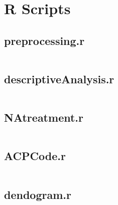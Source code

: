

\section{R Scripts}%
\label{sec:r_scripts}

\newcommand{\mintedfile}[1]{
    \subsection{#1}%
    \label{sub:#1}
    \inputminted{r}{../../analysis/#1}
    \pagebreak
}


\mintedfile{preprocessing.r}
\mintedfile{descriptiveAnalysis.r}
\mintedfile{NAtreatment.r}
\mintedfile{ACPCode.r}
\mintedfile{dendogram.r}
